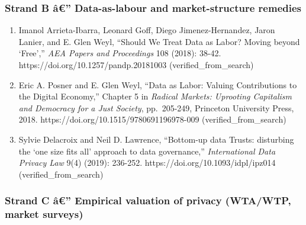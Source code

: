 \documentclass[
  11pt,
]{article}
\providecommand{\tightlist}{%
  \setlength{\itemsep}{0pt}\setlength{\parskip}{0pt}}
\begin{document}
\subsubsection{Strand B â€'' Data-as-labour and market-structure
remedies}\label{strand-b-uxe2-data-as-labour-and-market-structure-remedies}

\begin{enumerate}
\def\labelenumi{\arabic{enumi}.}
\setcounter{enumi}{5}
\tightlist
\item
  Imanol Arrieta-Ibarra, Leonard Goff, Diego Jimenez-Hernandez, Jaron
  Lanier, and E. Glen Weyl, ``Should We Treat Data as Labor? Moving
  beyond `Free','' \emph{AEA Papers and Proceedings} 108 (2018): 38-42.
  https://doi.org/10.1257/pandp.20181003 (verified\_from\_search)
\item
  Eric A. Posner and E. Glen Weyl, ``Data as Labor: Valuing
  Contributions to the Digital Economy,'' Chapter 5 in \emph{Radical
  Markets: Uprooting Capitalism and Democracy for a Just Society},
  pp.~205-249, Princeton University Press, 2018.
  https://doi.org/10.1515/9780691196978-009 (verified\_from\_search)
\item
  Sylvie Delacroix and Neil D. Lawrence, ``Bottom-up data Trusts:
  disturbing the `one size fits all' approach to data governance,''
  \emph{International Data Privacy Law} 9(4) (2019): 236-252.
  https://doi.org/10.1093/idpl/ipz014 (verified\_from\_search)
\end{enumerate}

\subsubsection{Strand C â€'' Empirical valuation of privacy (WTA/WTP,
market
surveys)}\label{strand-c-uxe2-empirical-valuation-of-privacy-wtawtp-market-surveys}
\end{document}

